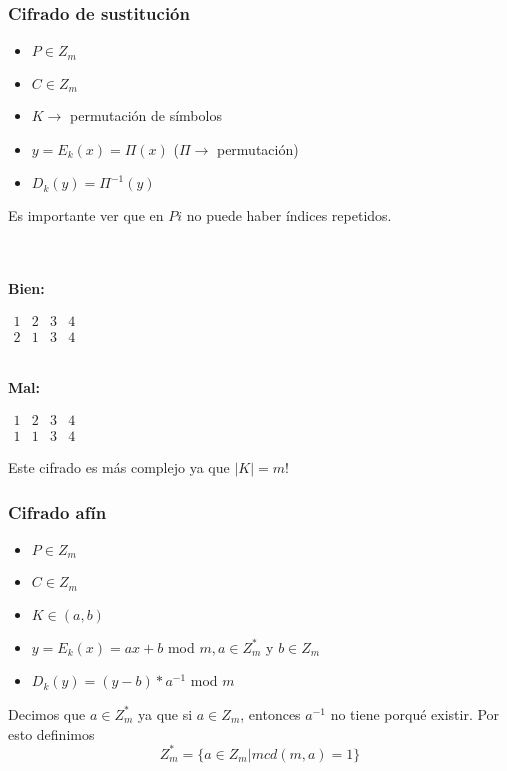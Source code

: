 \subsubsection{Cifrado de sustitución}

\begin{itemize}
		\item $P\in Z_m$
		\item $C\in Z_m$
		\item $K \rightarrow$ permutación de símbolos
		\item $y=E_k(x)= \Pi(x)$ ($\Pi \rightarrow$ permutación)
		\item $D_k(y) = \Pi^{-1}(y)$
\end{itemize}

Es importante ver que en $Pi$ no puede haber índices repetidos.
\begin{example}
	
	
	\textbf{\\ \\ Bien:}
	
	$\begin{matrix}
		1 & 2 & 3 & 4\\
		2 & 1 & 3 & 4
	\end{matrix}$
	
	\textbf{\\ Mal:}
	
		$\begin{matrix}
		1 & 2 & 3 & 4\\
		1 & 1 & 3 & 4
		\end{matrix}$
	
	
\end{example}

Este cifrado es más complejo ya que $|K| = m!$

\subsubsection{Cifrado afín}

\begin{itemize}
	\item $P\in Z_m$
	\item $C\in Z_m$
	\item $K \in (a,b)$
	\item $y=E_k(x)= ax + b$ mod $m , a\in Z^*_m$ y $b\in Z_m$
	\item $D_k(y) = (y-b)* a^{-1}$ mod $m$
\end{itemize}

Decimos que $ a\in Z^*_m$ ya que si $ a\in Z_m$, entonces $a^{-1}$ no tiene porqué existir. Por esto definimos
$$Z^*_m = \{a\in Z_m | mcd(m,a) = 1\}$$

